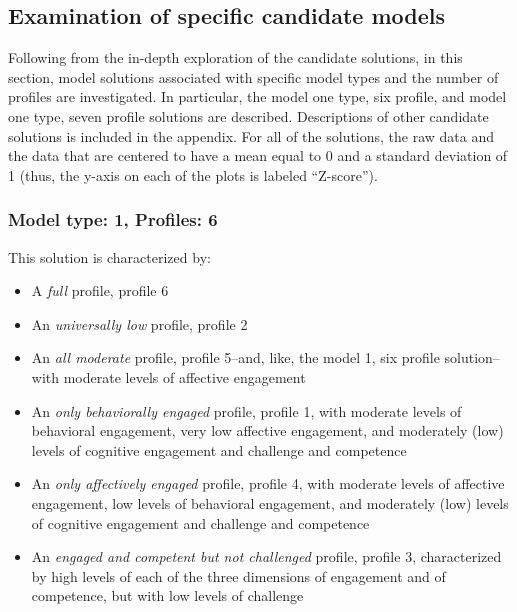 \documentclass[]{book}
\providecommand{\tightlist}{%
  \setlength{\itemsep}{0pt}\setlength{\parskip}{0pt}}
\theoremstyle{definition}
\theoremstyle{definition}
\theoremstyle{definition}
\theoremstyle{remark}
\begin{document}
\subsection{Examination of specific candidate
models}\label{examination-of-specific-candidate-models}

Following from the in-depth exploration of the candidate solutions, in
this section, model solutions associated with specific model types and
the number of profiles are investigated. In particular, the model one
type, six profile, and model one type, seven profile solutions are
described. Descriptions of other candidate solutions is included in the
appendix. For all of the solutions, the raw data and the data that are
centered to have a mean equal to 0 and a standard deviation of 1 (thus,
the y-axis on each of the plots is labeled ``Z-score'').

\subsubsection{Model type: 1, Profiles:
6}\label{model-type-1-profiles-6}

This solution is characterized by:

\begin{itemize}
\tightlist
\item
  A \emph{full} profile, profile 6
\item
  An \emph{universally low} profile, profile 2
\item
  An \emph{all moderate} profile, profile 5--and, like, the model 1, six
  profile solution--with moderate levels of affective engagement
\item
  An \emph{only behaviorally engaged} profile, profile 1, with moderate
  levels of behavioral engagement, very low affective engagement, and
  moderately (low) levels of cognitive engagement and challenge and
  competence
\item
  An \emph{only affectively engaged} profile, profile 4, with moderate
  levels of affective engagement, low levels of behavioral engagement,
  and moderately (low) levels of cognitive engagement and challenge and
  competence
\item
  An \emph{engaged and competent but not challenged} profile, profile 3,
  characterized by high levels of each of the three dimensions of
  engagement and of competence, but with low levels of challenge
\end{itemize}
\end{document}
